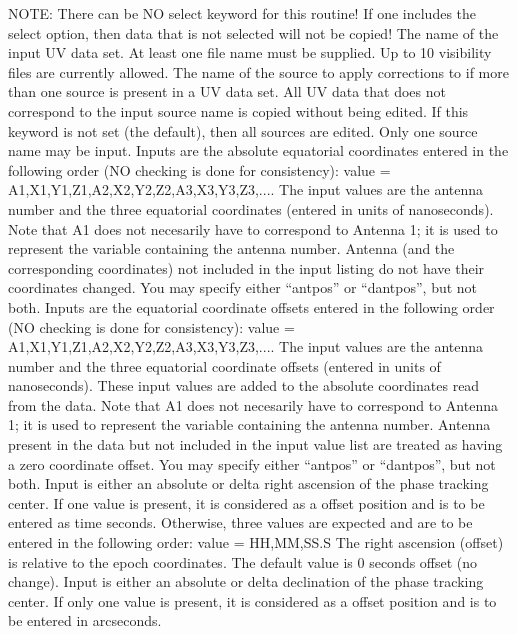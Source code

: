 {NOTE: There can be NO select keyword for this routine!  If
one includes the select option, then data that is not selected
will not be copied!
The name of the input UV data set.  At least one file name must
be supplied.  Up to 10 visibility files are currently allowed.
The name of the source to apply corrections to if more than
one source is present in a UV data set.  All UV data that does
not correspond to the input source name is copied without being
edited.  If this keyword is not set (the default), then all
sources are edited.  Only one source name may be input.
Inputs are the absolute equatorial coordinates entered in the
following order (NO checking is done for consistency):
{\eightpoint\begintt
     value = A1,X1,Y1,Z1,A2,X2,Y2,Z2,A3,X3,Y3,Z3,....
\endtt}
The input values are the antenna number and the three equatorial
coordinates (entered in units of nanoseconds).  Note that A1 does
not necesarily have to correspond to Antenna 1; it is used to 
represent the variable containing the antenna number.  Antenna
(and the corresponding coordinates) not included in the input
listing do not have their coordinates changed.  You may specify
either ``antpos'' or ``dantpos'', but not both.
Inputs are the equatorial coordinate offsets entered in the
following order (NO checking is done for consistency):
{\eightpoint\begintt
     value = A1,X1,Y1,Z1,A2,X2,Y2,Z2,A3,X3,Y3,Z3,....
\endtt}
The input values are the antenna number and the three equatorial
coordinate offsets (entered in units of nanoseconds).  These input
values are added to the absolute coordinates read from the data.
Note that A1 does not necesarily have to correspond to Antenna 1;
it is used to represent the variable containing the antenna
number.  Antenna present in the data but not included in the
input value list are treated as having a zero coordinate offset.
You may specify either ``antpos'' or ``dantpos'', but not both.
Input is either an absolute or delta right ascension of the
phase tracking center.  If one value is present, it is considered
as a offset position and is to be entered as time seconds.
Otherwise, three values are expected and are to be entered in
the following order:
{\eightpoint\begintt
     value = HH,MM,SS.S
\endtt}
The right ascension (offset) is relative to the epoch coordinates.
The default value is 0 seconds offset (no change).
Input is either an absolute or delta declination of the phase
tracking center.  If only one value is present, it is considered
as a offset position and is to be entered in arcseconds.
}
